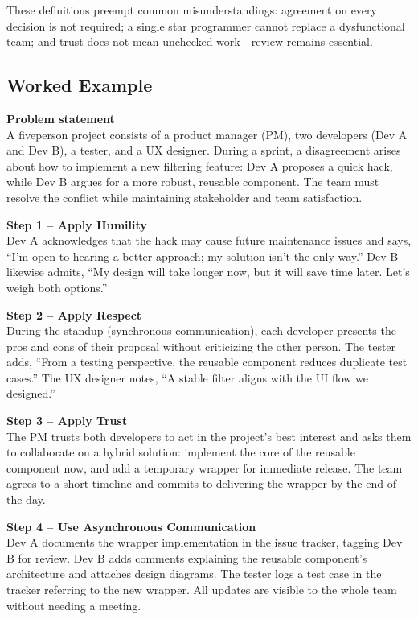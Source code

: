\documentclass[12pt, a4paper]{article}
\begin{document}
These definitions preempt common misunderstandings: agreement on every decision is not required; a single star programmer cannot replace a dysfunctional team; and trust does not mean unchecked work---review remains essential.

\subsection{Worked Example}
\textbf{Problem statement}\\
A fiveperson project consists of a product manager (PM), two developers (Dev A and Dev B), a tester, and a UX designer. During a sprint, a disagreement arises about how to implement a new filtering feature: Dev A proposes a quick hack, while Dev B argues for a more robust, reusable component. The team must resolve the conflict while maintaining stakeholder and team satisfaction.

\textbf{Step 1 -- Apply Humility}\\
Dev A acknowledges that the hack may cause future maintenance issues and says, ``I'm open to hearing a better approach; my solution isn't the only way.''  
Dev B likewise admits, ``My design will take longer now, but it will save time later. Let's weigh both options.''

\textbf{Step 2 -- Apply Respect}\\
During the standup (synchronous communication), each developer presents the pros and cons of their proposal without criticizing the other person. The tester adds, ``From a testing perspective, the reusable component reduces duplicate test cases.''  
The UX designer notes, ``A stable filter aligns with the UI flow we designed.''

\textbf{Step 3 -- Apply Trust}\\
The PM trusts both developers to act in the project's best interest and asks them to collaborate on a hybrid solution: implement the core of the reusable component now, and add a temporary wrapper for immediate release. The team agrees to a short timeline and commits to delivering the wrapper by the end of the day.

\textbf{Step 4 -- Use Asynchronous Communication}\\
Dev A documents the wrapper implementation in the issue tracker, tagging Dev B for review. Dev B adds comments explaining the reusable component's architecture and attaches design diagrams. The tester logs a test case in the tracker referring to the new wrapper. All updates are visible to the whole team without needing a meeting.
\end{document}
